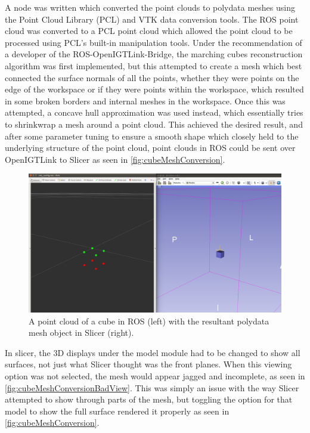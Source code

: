 \documentclass[12pt]{report}
\begin{document}
A node was written which converted the point clouds to polydata meshes using the Point Cloud Library (PCL) and VTK data conversion tools. The ROS point cloud was converted to a PCL point cloud which allowed the point cloud to be processed using PCL's built-in manipulation tools. Under the recommendation of a developer of the ROS-OpenIGTLink-Bridge, the marching cubes reconstruction algorithm was first implemented, but this attempted to create a mesh which best connected the surface normals of all the points, whether they were points on the edge of the workspace or if they were points within the workspace, which resulted in some broken borders and internal meshes in the workspace. Once this was attempted, a concave hull approximation was used instead, which essentially tries to shrinkwrap a mesh around a point cloud. This achieved the desired result, and after some parameter tuning to ensure a smooth shape which closely held to the underlying structure of the point cloud, point clouds in ROS could be sent over OpenIGTLink to Slicer as seen in \autoref{fig:cubeMeshConversion}. 

\begin{figure}[thpb]
	\centering
	\includegraphics[width=\textwidth]{images/cube_mesh_rviz_slicer.png}
    \caption{A point cloud of a cube in ROS (left) with the resultant polydata mesh object in Slicer (right).}
    \label{fig:cubeMeshConversion}
\end{figure}

In slicer, the 3D displays under the model module had to be changed to show all surfaces, not just what Slicer thought was the front planes. When this viewing option was not selected, the mesh would appear jagged and incomplete, as seen in \autoref{fig:cubeMeshConversionBadView}. This was simply an issue with the way Slicer attempted to show through parts of the mesh, but toggling the option for that model to show the full surface rendered it properly as seen in \autoref{fig:cubeMeshConversion}.
\end{document}
